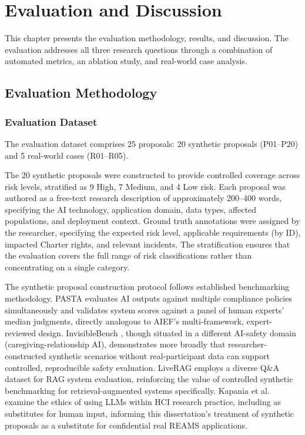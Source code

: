 \chapter{Evaluation and Discussion}
\label{ch:evaluation}

This chapter presents the evaluation methodology, results, and discussion. The evaluation addresses all three research questions through a combination of automated metrics, an ablation study, and real-world case analysis.


\section{Evaluation Methodology}

\subsection{Evaluation Dataset}

The evaluation dataset comprises 25 proposals: 20 synthetic proposals (P01--P20) and 5 real-world cases (R01--R05).

The 20 synthetic proposals were constructed to provide controlled coverage across risk levels, stratified as 9 High, 7 Medium, and 4 Low risk. Each proposal was authored as a free-text research description of approximately 200--400 words, specifying the AI technology, application domain, data types, affected populations, and deployment context. Ground truth annotations were assigned by the researcher, specifying the expected risk level, applicable requirements (by ID), impacted Charter rights, and relevant incidents. The stratification ensures that the evaluation covers the full range of risk classifications rather than concentrating on a single category.

The synthetic proposal construction protocol follows established benchmarking methodology. PASTA \cite{pasta2026} evaluates AI outputs against multiple compliance policies simultaneously and validates system scores against a panel of human experts' median judgments, directly analogous to AIEF's multi-framework, expert-reviewed design. InvisibleBench \cite{invisiblebench2025}, though situated in a different AI-safety domain (caregiving-relationship AI), demonstrates more broadly that researcher-constructed synthetic scenarios without real-participant data can support controlled, reproducible safety evaluation. LiveRAG \cite{liverag2025} employs a diverse Q\&A dataset for RAG system evaluation, reinforcing the value of controlled synthetic benchmarking for retrieval-augmented systems specifically. Kapania et al. \cite{kapania2024} examine the ethics of using LLMs within HCI research practice, including as substitutes for human input, informing this dissertation's treatment of synthetic proposals as a substitute for confidential real REAMS applications.


